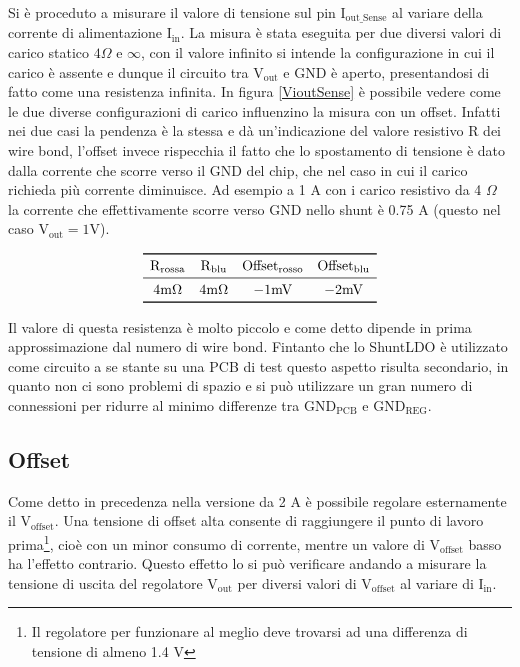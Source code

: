 Si è proceduto a misurare il valore di tensione sul pin $\mathrm{I_{out{\_}Sense}}$ al variare della corrente di alimentazione $\mathrm{I_{in}}$. 
La misura è stata eseguita per due diversi valori di carico statico $4 \Omega$ e $\infty$, con il valore infinito si intende la configurazione in cui il carico è assente e dunque il circuito tra $\mathrm{V_{out}}$ e GND è aperto, presentandosi di fatto come una resistenza infinita. 
In figura \ref{VioutSense} è possibile vedere come le due diverse configurazioni di carico influenzino la misura con un offset. 
Infatti nei due casi la pendenza è la stessa e dà un'indicazione del valore resistivo R dei wire bond, l'offset invece rispecchia il fatto che lo spostamento di tensione è dato dalla corrente che scorre verso il GND del chip, che nel caso in cui il carico richieda più corrente diminuisce. Ad esempio a 1 A con i carico resistivo da 4 $\Omega$ la corrente che effettivamente scorre verso GND nello shunt è 0.75 A (questo nel caso $\mathrm{V_{out} = 1 V}$).

\[
\begin{array}{cccc}

\toprule
\mathrm{R_{rossa}}  & \mathrm{R_{blu}} & \mathrm{Offset_{rosso}} & \mathrm{Offset_{blu}} \\

\midrule

\mathrm{4 m} \Omega & \mathrm{4 m}\Omega & \mathrm{-1 mV}  & \mathrm{-2 mV} \\

\bottomrule
\end{array}
\]

Il valore di questa resistenza è molto piccolo e come detto dipende in prima approssimazione dal numero di wire bond. 
Fintanto che lo ShuntLDO è utilizzato come circuito a se stante su una PCB di test questo aspetto risulta secondario, in quanto non ci sono problemi di spazio e si può utilizzare un gran numero di connessioni per ridurre al minimo differenze tra $\mathrm{GND_{PCB}}$ e $\mathrm{GND_{REG}}$. 


  
\subsection{Offset}
Come detto in precedenza nella versione da 2 A è possibile regolare esternamente il $\mathrm{V_{offset}}$. 
Una tensione di offset alta consente di raggiungere il punto di lavoro prima\footnote{Il regolatore per funzionare al meglio deve trovarsi ad una differenza di tensione di almeno 1.4 V}, cioè con un minor consumo di corrente, mentre un valore di $\mathrm{V_{offset}}$ basso ha l'effetto contrario. Questo effetto lo si può verificare andando a misurare la tensione di uscita del regolatore $\mathrm{V_{out}}$ per diversi valori di $\mathrm{V_{offset}}$ al variare di $\mathrm{I_{in}}$.

